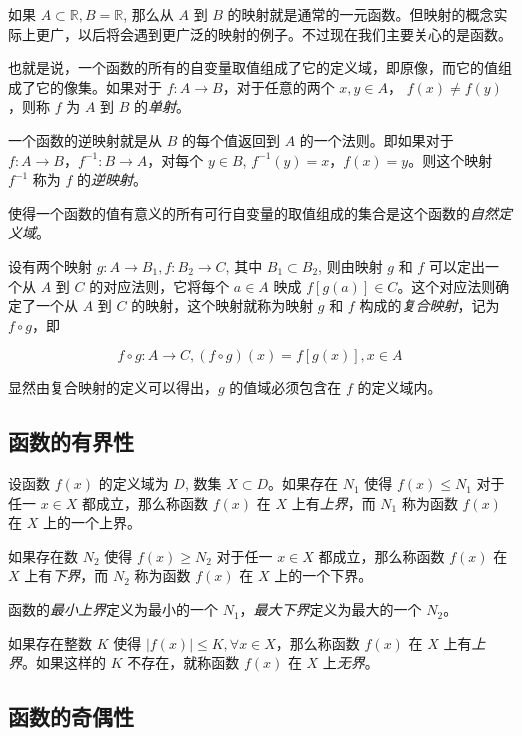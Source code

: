 \documentclass[lang=cn,10pt]{template}
\begin{document}
如果 $A \subset \mathbb R, B = \mathbb R$, 那么从 $A$ 到 $B$ 的映射就是通常的一元函数。但映射的概念实际上更广，以后将会遇到更广泛的映射的例子。不过现在我们主要关心的是函数。

也就是说，一个函数的所有的自变量取值组成了它的定义域，即原像，而它的值组成了它的像集。如果对于 $f: A \rightarrow B$，对于任意的两个 $x, y \in A$， $f(x) \neq f(y)$，则称 $f$ 为 $A$ 到 $B$ 的\emph{单射}。

一个函数的逆映射就是从 $B$ 的每个值返回到 $A$ 的一个法则。即如果对于 $f: A \rightarrow B$，$f^{-1}: B \rightarrow A$，对每个 $y \in B$, $f^{-1}(y) = x$，$f(x) = y$。则这个映射 $f^{-1}$ 称为 $f$ 的\emph{逆映射}。

使得一个函数的值有意义的所有可行自变量的取值组成的集合是这个函数的\emph{自然定义域}。

设有两个映射 $g: A \rightarrow B_1, f: B_2 \rightarrow C$, 其中 $B_1 \subset B_2$, 则由映射 $g$ 和 $f$ 可以定出一个从 $A$ 到 $C$ 的对应法则，它将每个 $a \in A$ 映成 $f[g(a)] \in C$。这个对应法则确定了一个从 $A$ 到 $C$ 的映射，这个映射就称为映射 $g$ 和 $f$ 构成的\emph{复合映射}，记为 $f\circ g$，即

\begin{equation*}
  f \circ g: A \rightarrow C, (f \circ g)(x) = f[g(x)], x \in A
\end{equation*}

显然由复合映射的定义可以得出，$g$ 的值域必须包含在 $f$ 的定义域内。

\subsection{函数的有界性}

设函数 $f(x)$ 的定义域为 $D$, 数集 $X \subset D$。如果存在 $N_1$ 使得 $f(x) \leq N_1$ 对于任一 $x \in X$ 都成立，那么称函数 $f(x)$ 在 $X$ 上有\emph{上界}，而 $N_1$ 称为函数 $f(x)$ 在 $X$ 上的一个上界。

如果存在数 $N_2$ 使得 $f(x) \geq N_2$ 对于任一 $x \in X$ 都成立，那么称函数 $f(x)$ 在 $X$ 上有\emph{下界}，而 $N_2$ 称为函数 $f(x)$ 在 $X$ 上的一个下界。

函数的\emph{最小上界}定义为最小的一个 $N_1$，\emph{最大下界}定义为最大的一个 $N_2$。

如果存在整数 $K$ 使得 $|f(x)| \leq K, \forall x \in X$，那么称函数 $f(x)$ 在 $X$ 上有\emph{上界}。如果这样的 $K$ 不存在，就称函数 $f(x)$ 在 $X$ 上\emph{无界}。

\subsection{函数的奇偶性}
\end{document}
